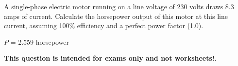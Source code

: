 

A single-phase electric motor running on a line voltage of 230 volts draws 8.3 amps of current.  Calculate the horsepower output of this motor at this line current, assuming 100\% efficiency and a perfect power factor (1.0).







$P$ = 2.559 horsepower







{\bf This question is intended for exams only and not worksheets!}.


